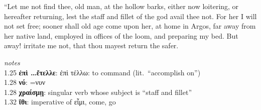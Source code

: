 \documentclass{ransom}
\begin{document}
“Let me not find thee, old man, at the hollow barks, either now
loitering, or hereafter returning, lest the staff and fillet of the god
avail thee not. For her I will not set free; sooner shall old age
come upon her, at home in Argos, far away from her native land,
employed in offices of the loom, and preparing my bed. But away!
irritate me not, that thou mayest return the safer.
    \par
    \textit{notes}\\
    1.25 \textbf{ἐπὶ \ldots ἔτελλε}: ἐπὶ τέλλω: to command (lit.~``accomplish on'')\\1.28 \textbf{νύ}: =νυν\\1.28 \textbf{χραίσμῃ}: singular verb whose subject is ``staff and fillet''\\1.32 \textbf{ἴθι}: imperative of εἶμι, come, go
    \begin{vocabpage}
\begin{vocabcommon}
\\\\\\\\\\\\\\\\\\\\\\\\\\\\\\\\\\\\\\\\\\\\\\\\\end{vocabcommon}

\end{vocabpage}
\end{document}
